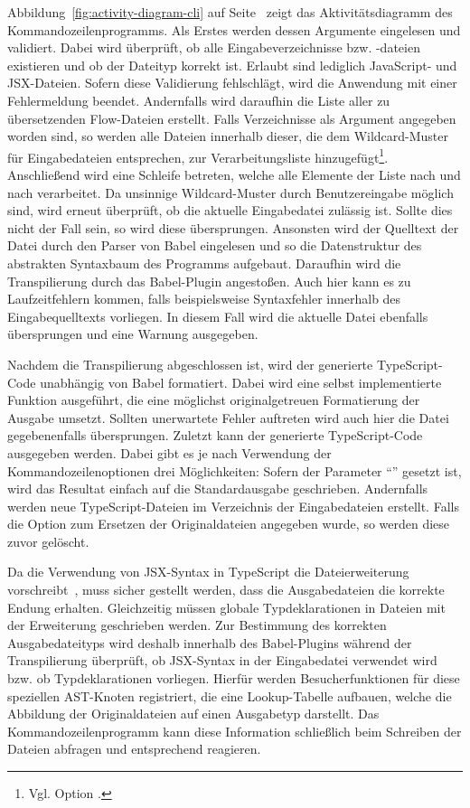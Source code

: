Abbildung~\ref{fig:activity-diagram-cli} auf Seite~\pageref{fig:activity-diagram-cli} zeigt das Aktivitätsdiagramm des Kommandozeilenprogramms. Als Erstes werden dessen Argumente eingelesen und validiert. Dabei wird überprüft, ob alle Eingabeverzeichnisse bzw. -dateien existieren und ob der Dateityp korrekt ist. Erlaubt sind lediglich JavaScript- und JSX-Dateien. Sofern diese Validierung fehlschlägt, wird die Anwendung mit einer Fehlermeldung beendet. Andernfalls wird daraufhin die Liste aller zu übersetzenden Flow-Dateien erstellt. Falls Verzeichnisse als Argument angegeben worden sind, so werden alle Dateien innerhalb dieser, die dem Wildcard-Muster für Eingabedateien entsprechen, zur Verarbeitungsliste hinzugefügt\footnote{Vgl. Option .}. Anschließend wird eine Schleife betreten, welche alle Elemente der Liste nach und nach verarbeitet. Da unsinnige Wildcard-Muster durch Benutzereingabe möglich sind, wird erneut überprüft, ob die aktuelle Eingabedatei zulässig ist. Sollte dies nicht der Fall sein, so wird diese übersprungen. Ansonsten wird der Quelltext der Datei durch den Parser von Babel eingelesen und so die Datenstruktur des abstrakten Syntaxbaum des Programms aufgebaut. Daraufhin wird die Transpilierung durch das Babel-Plugin angestoßen. Auch hier kann es zu Laufzeitfehlern kommen, falls beispielsweise Syntaxfehler innerhalb des Eingabequelltexts vorliegen. In diesem Fall wird die aktuelle Datei ebenfalls übersprungen und eine Warnung ausgegeben.

Nachdem die Transpilierung abgeschlossen ist, wird der generierte TypeScript-Code unabhängig von Babel formatiert. Dabei wird eine selbst implementierte Funktion ausgeführt, die eine möglichst originalgetreuen Formatierung der Ausgabe umsetzt. Sollten unerwartete Fehler auftreten wird auch hier die Datei gegebenenfalls übersprungen. Zuletzt kann der generierte TypeScript-Code ausgegeben werden. Dabei gibt es je nach Verwendung der Kommandozeilenoptionen drei Möglichkeiten: Sofern der Parameter \enquote{} gesetzt ist, wird das Resultat einfach auf die Standardausgabe geschrieben. Andernfalls werden neue TypeScript-Dateien im Verzeichnis der Eingabedateien erstellt. Falls die Option zum Ersetzen der Originaldateien angegeben wurde, so werden diese zuvor gelöscht.

Da die Verwendung von JSX-Syntax in TypeScript die Dateierweiterung  vorschreibt~\autocite{TS:HANDBOOK:JSX}, muss sicher gestellt werden, dass die Ausgabedateien die korrekte Endung erhalten. Gleichzeitig müssen globale Typdeklarationen in Dateien mit der Erweiterung  geschrieben werden. Zur Bestimmung des korrekten Ausgabedateityps wird deshalb innerhalb des Babel-Plugins während der Transpilierung überprüft, ob JSX-Syntax in der Eingabedatei verwendet wird bzw. ob Typdeklarationen vorliegen. Hierfür werden Besucherfunktionen für diese speziellen AST-Knoten registriert, die eine Lookup-Tabelle aufbauen, welche die Abbildung der Originaldateien auf einen Ausgabetyp darstellt. Das Kommandozeilenprogramm kann diese Information schließlich beim Schreiben der Dateien abfragen und entsprechend reagieren.

